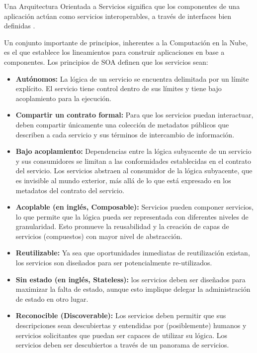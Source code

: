         Una Arquitectura Orientada a Servicios significa que los componentes de una aplicación actúan como servicios interoperables, a través de interfaces bien definidas \cite{Fox2013-ct}.
        
        Un conjunto importante de principios, inherentes a la Computación en la Nube, es el que establece los lineamientos para construir aplicaciones en base a componentes. Los principios de SOA definen que los servicios sean:
        \begin{itemize}
            \item \textbf{Autónomos: }La lógica de un servicio se encuentra delimitada por un límite explícito. El servicio tiene control dentro de sus límites y tiene bajo acoplamiento para la ejecución. 
            \item \textbf{Compartir un contrato formal: }Para que los servicios puedan interactuar, deben compartir únicamente una colección de metadatos públicos que describen a cada servicio y sus términos de intercambio de información.
            \item \textbf{Bajo acoplamiento:} Dependencias entre la lógica subyacente de un servicio y sus consumidores se limitan a las conformidades establecidas en el contrato del servicio. Los servicios abstraen al consumidor de la lógica subyacente, que es invisible al mundo exterior, más allá de lo que está expresado en los metadatos del contrato del servicio.
            \item \textbf{Acoplable (en inglés, Composable):} Servicios pueden componer servicios, lo que permite que la lógica pueda ser representada con diferentes niveles de granularidad. Esto promueve la reusabilidad y la creación de capas de servicios (compuestos) con mayor nivel de abstracción.
            \item \textbf{Reutilizable: }Ya sea que oportunidades inmediatas de reutilización existan, los servicios son diseñados para ser potencialmente re-utilizados.
            \item \textbf{Sin estado (en inglés, Stateless):} los servicios deben ser diseñados para maximizar la falta de estado, aunque esto implique delegar la administración de estado en otro lugar.
            \item \textbf{Reconocible (Discoverable): }Los servicios deben permitir que sus descripciones sean descubiertas y entendidas por (posiblemente) humanos y servicios solicitantes que puedan ser capaces de utilizar su lógica. Los servicios deben ser descubiertos a través de un panorama de servicios.
        \end{itemize}
        
